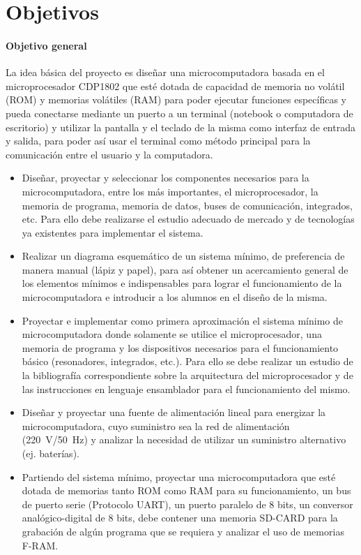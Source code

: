 \section{Objetivos}
\paragraph{Objetivo general} La idea básica del proyecto es diseñar una microcomputadora basada en el microprocesador CDP1802 que esté dotada de capacidad de memoria no volátil (ROM) y memorias volátiles (RAM) para poder ejecutar funciones específicas y pueda conectarse mediante un puerto a un terminal (notebook o computadora de escritorio) y utilizar la pantalla y el teclado de la misma como interfaz de entrada y salida, para poder así usar el terminal como método principal para la comunicación entre el usuario y la computadora.

\begin{itemize}
\item Diseñar, proyectar y seleccionar los componentes necesarios para la microcomputadora, entre los más importantes, el microprocesador, la memoria de programa, memoria de datos, buses de comunicación, integrados, etc. Para ello debe realizarse el estudio adecuado de mercado y de tecnologías ya existentes para implementar el sistema.

 \item Realizar un diagrama esquemático de un sistema mínimo, de preferencia de manera manual (lápiz y papel), para así obtener un acercamiento general de los elementos mínimos e indispensables para lograr el funcionamiento de la microcomputadora e introducir a los alumnos en el diseño de la misma. 
\item Proyectar e implementar como primera aproximación el sistema mínimo de microcomputadora donde solamente se utilice el microprocesador, una memoria de programa y los dispositivos necesarios para el funcionamiento básico (resonadores, integrados, etc.). Para ello se debe realizar un estudio de la bibliografía correspondiente sobre la arquitectura del microprocesador y de las instrucciones en lenguaje ensamblador para el funcionamiento del mismo.


 
\item Diseñar y proyectar una fuente de alimentación lineal para energizar la microcomputadora, cuyo suministro sea la red de alimentación (220~V/50~Hz) y analizar la necesidad de utilizar un suministro alternativo (ej. baterías). 

\item Partiendo del sistema mínimo, proyectar una microcomputadora que esté dotada de memorias tanto ROM como RAM para su funcionamiento, un bus de puerto serie (Protocolo UART), un puerto paralelo de 8 bits, un conversor analógico-digital de 8 bits, debe contener una memoria SD-CARD para la grabación de algún programa que se requiera y analizar el uso de memorias F-RAM.

\end{itemize}


